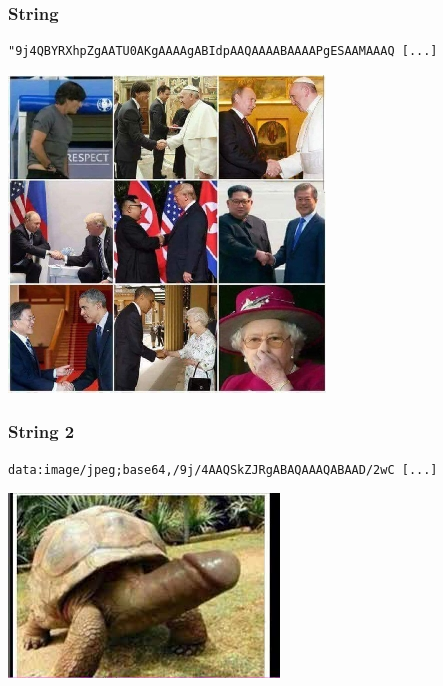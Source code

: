 \begin{frame}[fragile]
\frametitle{String}
\begin{lstlisting}
"9j4QBYRXhpZgAATU0AKgAAAAgABIdpAAQAAAABAAAAPgESAAMAAAQ [...]
\end{lstlisting}
\end{frame}

\begin{frame}
    \centering
    \includegraphics[width=0.7\linewidth]{pics/string.jpeg}
\end{frame}

\begin{frame}[fragile]
\frametitle{String 2}
\begin{lstlisting}
data:image/jpeg;base64,/9j/4AAQSkZJRgABAQAAAQABAAD/2wC [...]
\end{lstlisting}
\end{frame}

\begin{frame}
    \centering
    \includegraphics[width=0.7\linewidth]{pics/string2.jpeg}
\end{frame}


